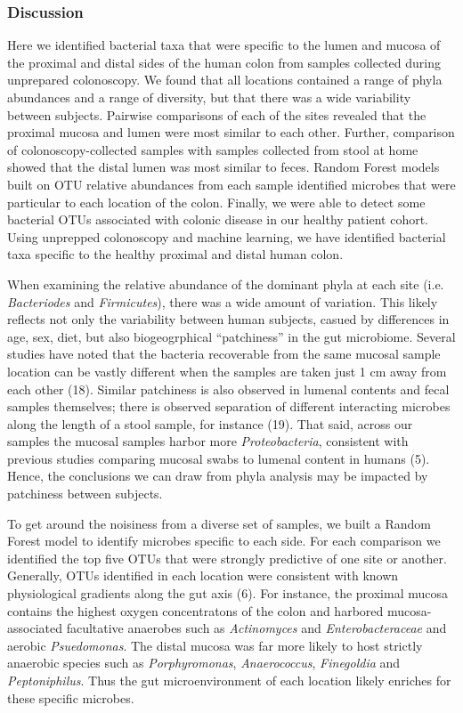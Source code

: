 \documentclass[11pt,]{article}
\begin{document}
\subsubsection{Discussion}\label{discussion}

Here we identified bacterial taxa that were specific to the lumen and
mucosa of the proximal and distal sides of the human colon from samples
collected during unprepared colonoscopy. We found that all locations
contained a range of phyla abundances and a range of diversity, but that
there was a wide variability between subjects. Pairwise comparisons of
each of the sites revealed that the proximal mucosa and lumen were most
similar to each other. Further, comparison of colonoscopy-collected
samples with samples collected from stool at home showed that the distal
lumen was most similar to feces. Random Forest models built on OTU
relative abundances from each sample identified microbes that were
particular to each location of the colon. Finally, we were able to
detect some bacterial OTUs associated with colonic disease in our
healthy patient cohort. Using unprepped colonoscopy and machine
learning, we have identified bacterial taxa specific to the healthy
proximal and distal human colon.

When examining the relative abundance of the dominant phyla at each site
(i.e. \emph{Bacteriodes} and \emph{Firmicutes}), there was a wide amount
of variation. This likely reflects not only the variability between
human subjects, casued by differences in age, sex, diet, but also
biogeogrphical ``patchiness'' in the gut microbiome. Several studies
have noted that the bacteria recoverable from the same mucosal sample
location can be vastly different when the samples are taken just 1 cm
away from each other (18). Similar patchiness is also observed in
lumenal contents and fecal samples themselves; there is observed
separation of different interacting microbes along the length of a stool
sample, for instance (19). That said, across our samples the mucosal
samples harbor more \emph{Proteobacteria}, consistent with previous
studies comparing mucosal swabs to lumenal content in humans (5). Hence,
the conclusions we can draw from phyla analysis may be impacted by
patchiness between subjects.

To get around the noisiness from a diverse set of samples, we built a
Random Forest model to identify microbes specific to each side. For each
comparison we identified the top five OTUs that were strongly predictive
of one site or another. Generally, OTUs identified in each location were
consistent with known physiological gradients along the gut axis (6).
For instance, the proximal mucosa contains the highest oxygen
concentratons of the colon and harbored mucosa-associated facultative
anaerobes such as \emph{Actinomyces} and \emph{Enterobacteraceae} and
aerobic \emph{Psuedomonas}. The distal mucosa was far more likely to
host strictly anaerobic species such as \emph{Porphyromonas},
\emph{Anaerococcus}, \emph{Finegoldia} and \emph{Peptoniphilus}. Thus
the gut microenvironment of each location likely enriches for these
specific microbes.
\end{document}
